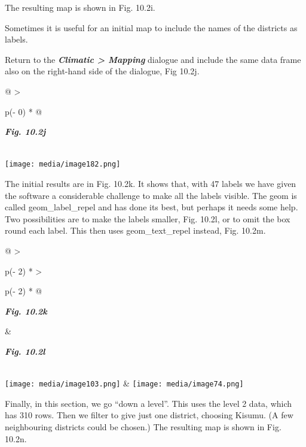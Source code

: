 \documentclass[
  letterpaper,
  DIV=11,
  numbers=noendperiod]{scrreprt}
\begin{document}
The resulting map is shown in Fig. 10.2i.

Sometimes it is useful for an initial map to include the names of the
districts as labels.

Return to the \textbf{\emph{Climatic \textgreater{} Mapping}} dialogue
and include the same data frame also on the right-hand side of the
dialogue, Fig 10.2j.

\begin{longtable}[]{@{}
  >{\raggedright\arraybackslash}p{(\columnwidth - 0\tabcolsep) * }@{}}
\toprule\noalign{}
\begin{minipage}[b]{\linewidth}\raggedright
\textbf{\emph{Fig. 10.2j}}
\end{minipage} \\
\midrule\noalign{}
\endhead
\bottomrule\noalign{}
\endlastfoot
\texttt{[image: media/image182.png]} \\
\end{longtable}

The initial results are in Fig. 10.2k. It shows that, with 47 labels we
have given the software a considerable challenge to make all the labels
visible. The geom is called geom\_label\_repel and has done its best,
but perhaps it needs some help. Two possibilities are to make the labels
smaller, Fig. 10.2l, or to omit the box round each label. This then uses
geom\_text\_repel instead, Fig. 10.2m.

\begin{longtable}[]{@{}
  >{\raggedright\arraybackslash}p{(\columnwidth - 2\tabcolsep) * }
  >{\raggedright\arraybackslash}p{(\columnwidth - 2\tabcolsep) * }@{}}
\toprule\noalign{}
\begin{minipage}[b]{\linewidth}\raggedright
\textbf{\emph{Fig. 10.2k}}
\end{minipage} & \begin{minipage}[b]{\linewidth}\raggedright
\textbf{\emph{Fig. 10.2l}}
\end{minipage} \\
\midrule\noalign{}
\endhead
\bottomrule\noalign{}
\endlastfoot
\texttt{[image: media/image103.png]} &
\texttt{[image: media/image74.png]} \\
\end{longtable}

Finally, in this section, we go ``down a level''. This uses the level 2
data, which has 310 rows. Then we filter to give just one district,
choosing Kisumu. (A few neighbouring districts could be chosen.) The
resulting map is shown in Fig. 10.2n.
\end{document}

